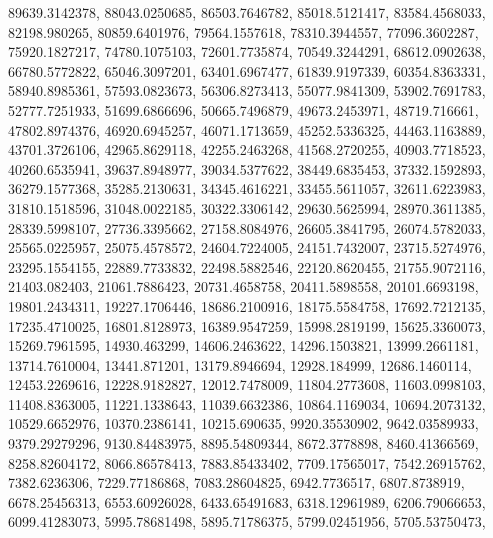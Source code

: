 \begin{code}
\begin{hide}
{     89639.3142378,     88043.0250685,     86503.7646782,
     85018.5121417,     83584.4568033,      82198.980265,
     80859.6401976,     79564.1557618,     78310.3944557,
     77096.3602287,     75920.1827217,     74780.1075103,
     72601.7735874,     70549.3244291,     68612.0902638,
     66780.5772822,     65046.3097201,     63401.6967477,
     61839.9197339,     60354.8363331,     58940.8985361,
     57593.0823673,     56306.8273413,     55077.9841309,
     53902.7691783,     52777.7251933,     51699.6866696,
     50665.7496879,     49673.2453971,      48719.716661,
     47802.8974376,     46920.6945257,     46071.1713659,
     45252.5336325,     44463.1163889,     43701.3726106,
     42965.8629118,     42255.2463268,     41568.2720255,
     40903.7718523,     40260.6535941,     39637.8948977,
     39034.5377622,     38449.6835453,     37332.1592893,
     36279.1577368,     35285.2130631,     34345.4616221,
     33455.5611057,     32611.6223983,     31810.1518596,
     31048.0022185,     30322.3306142,     29630.5625994,
     28970.3611385,     28339.5998107,     27736.3395662,
     27158.8084976,     26605.3841795,     26074.5782033,
     25565.0225957,     25075.4578572,     24604.7224005,
     24151.7432007,     23715.5274976,     23295.1554155,
     22889.7733832,     22498.5882546,     22120.8620455,
     21755.9072116,      21403.082403,     21061.7886423,
     20731.4658758,     20411.5898558,     20101.6693198,
     19801.2434311,     19227.1706446,     18686.2100916,
     18175.5584758,     17692.7212135,     17235.4710025,
     16801.8128973,     16389.9547259,     15998.2819199,
     15625.3360073,     15269.7961595,      14930.463299,
     14606.2463622,     14296.1503821,     13999.2661181,
     13714.7610004,      13441.871201,     13179.8946694,
      12928.184999,     12686.1460114,     12453.2269616,
     12228.9182827,     12012.7478009,     11804.2773608,
     11603.0998103,     11408.8363005,     11221.1338643,
     11039.6632386,     10864.1169034,     10694.2073132,
     10529.6652976,     10370.2386141,      10215.690635,
     9920.35530902,     9642.03589933,     9379.29279296,
     9130.84483975,     8895.54809344,      8672.3778898,
     8460.41366569,     8258.82604172,     8066.86578413,
     7883.85433402,     7709.17565017,     7542.26915762,
      7382.6236306,     7229.77186868,     7083.28604825,
      6942.7736517,      6807.8738919,     6678.25456313,
     6553.60926028,     6433.65491683,     6318.12961989,
     6206.79066653,     6099.41283073,     5995.78681498,
     5895.71786375,     5799.02451956,     5705.53750473,
}
\end{hide}
\end{code}

